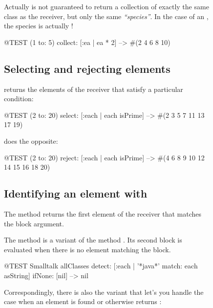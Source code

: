 \documentclass[a4paper,10pt,twoside]{book}
\begin{document}
\begin{figure}
\begin{center}
Actually  is not guaranteed to return a collection of exactly the same class as the receiver, but only the same \emph{``species''}.
In the case of an , the species is actually !
\begin{code}{@TEST}
(1 to: 5) collect: [:ea | ea * 2] --> #(2 4 6 8 10)
\end{code}

\subsection{Selecting and rejecting elements}

 returns the elements of the receiver that satisfy a particular condition:

\begin{code}{@TEST}
(2 to: 20) select: [:each | each isPrime] --> #(2 3 5 7 11 13 17 19)
\end{code}

 does the opposite:
\begin{code}{@TEST}
(2 to: 20) reject: [:each | each isPrime] --> #(4 6 8 9 10 12 14 15 16 18 20)
\end{code}

\subsection{Identifying an element with }
The method  returns the first element of the receiver that matches the block argument. 


The method  is a variant of the method .
Its second block is evaluated when there is no element matching the block.

\begin{code}{@TEST}
Smalltalk allClasses detect: [:each | '*java*' match: each asString] ifNone: [nil] --> nil
\end{code}

Correspondingly, there is also the variant  that let's you handle the case when an element is found or otherwise returns :


\end{center}
\end{figure}
\end{document}
